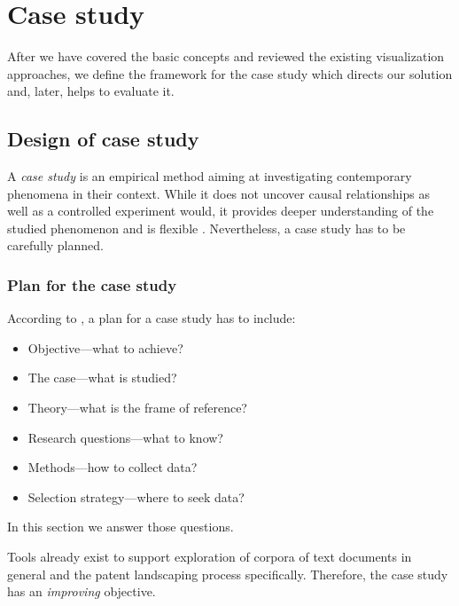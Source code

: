 \chapter{Case study}
\label{ch:case_study}

After we have covered the basic concepts and reviewed the existing visualization approaches, we define the framework for the case study which directs our solution and, later, helps to evaluate it.

\section{Design of case study}
\label{sec:design_of_case_study}

A \textit{case study} is an empirical method aiming at investigating contemporary phenomena in their context. 
While it does not uncover causal relationships as well as a controlled experiment would, it provides deeper understanding of the studied phenomenon and is flexible \cite{Runeson2009}.
Nevertheless, a case study has to be carefully planned.

\subsection{Plan for the case study}
\label{subsec:plan_for_case_study}

According to \cite{robson2002real}, a plan for a case study has to include:
\begin{itemize}
\item Objective—what to achieve?
\item The case—what is studied?
\item Theory—what is the frame of reference? 
\item Research questions—what to know?
\item Methods—how to collect data?
\item Selection strategy—where to seek data?
\end{itemize}

In this section we answer those questions.

Tools already exist to support exploration of corpora of text documents in general and the patent landscaping process specifically.
Therefore, the case study has an \textit{improving} objective.

